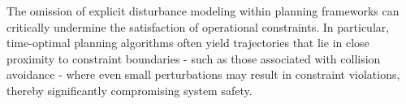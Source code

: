 %
%
%

The omission of explicit disturbance modeling within planning frameworks can critically undermine the satisfaction of operational constraints. In particular, time-optimal planning algorithms often yield trajectories that lie in close proximity to constraint boundaries - such as those associated with collision avoidance - where even small perturbations may result in constraint violations, thereby significantly compromising system safety.

